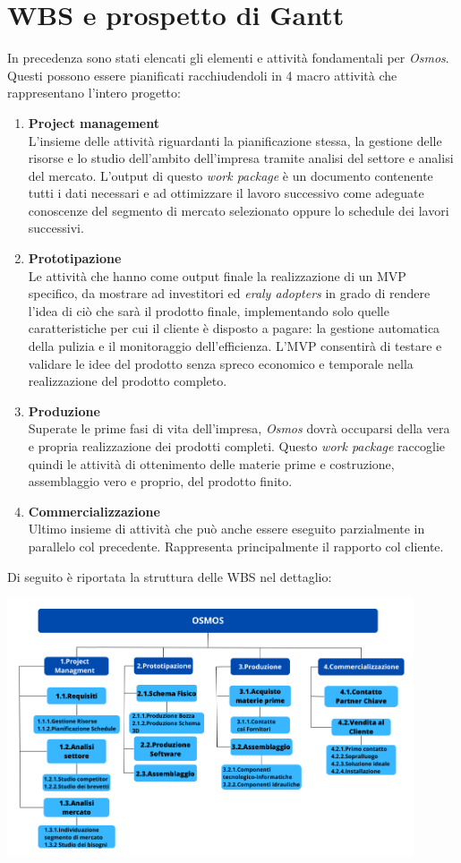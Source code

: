 \documentclass[a4paper, 12pt]{article}
\begin{document}
	\section{WBS e prospetto di Gantt}
	In precedenza sono stati elencati gli elementi e attività fondamentali per \emph{Osmos}. Questi possono essere pianificati racchiudendoli in 4 macro attività che rappresentano l'intero progetto:
	\begin{enumerate}
		\item \textbf{Project management}\\
			  L'insieme delle attività riguardanti la pianificazione stessa, la gestione delle risorse e lo studio dell'ambito dell'impresa tramite analisi del settore e analisi del mercato. L'output di questo \emph{work package} è un documento contenente tutti i dati necessari e ad ottimizzare il lavoro successivo come adeguate conoscenze del segmento di mercato selezionato oppure lo schedule dei lavori successivi.
		\item \textbf{Prototipazione}\\
			  Le attività che hanno come output finale la realizzazione di un MVP specifico, da mostrare ad investitori ed \emph{eraly adopters} in grado di rendere l'idea di ciò che sarà il prodotto finale, implementando solo quelle caratteristiche per cui il cliente è disposto a pagare: la gestione automatica della pulizia e il monitoraggio dell'efficienza. L'MVP consentirà di testare e validare le idee del prodotto senza spreco economico e temporale nella realizzazione del prodotto completo.
		\item \textbf{Produzione}\\
			  Superate le prime fasi di vita dell'impresa, \emph{Osmos} dovrà occuparsi della vera e propria realizzazione dei prodotti completi. Questo \emph{work package} raccoglie quindi le attività di ottenimento delle materie prime e costruzione, assemblaggio vero e proprio, del prodotto finito.
		\item \textbf{Commercializzazione}\\
			  Ultimo insieme di attività che può anche essere eseguito parzialmente in parallelo col precedente. Rappresenta principalmente il rapporto col cliente.
	\end{enumerate}
	Di seguito è riportata la struttura delle WBS nel dettaglio:
	\begin{center}
		\includegraphics[width=0.9\textwidth]{Images/WBS.png}
	\end{center}
\end{document}
